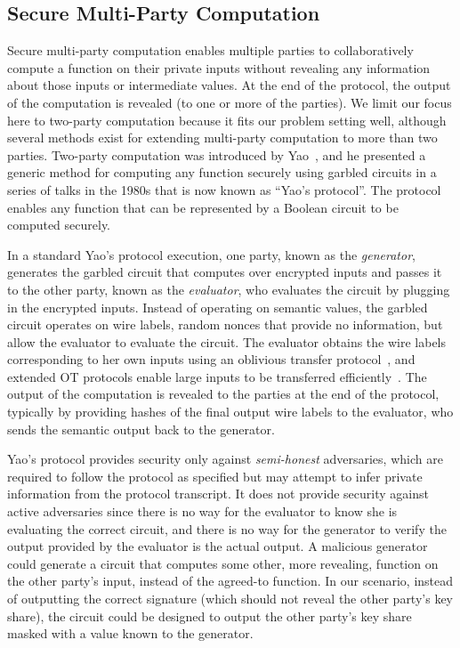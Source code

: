 \subsection{Secure Multi-Party Computation}
\label{sec:multi_party_computation}

Secure multi-party computation enables multiple parties to collaboratively compute a function on their private inputs without revealing any information about those inputs or intermediate values.  At the end of the protocol, the output of the computation is revealed (to one or more of the parties). We limit our focus here to two-party computation because it fits our problem setting well, although several methods exist for extending multi-party computation to more than two parties.  Two-party computation was introduced by Yao~\cite{yao1982protocols}, and he presented a generic method for computing any function securely using garbled circuits in a series of talks in the 1980s that is now known as ``Yao's protocol''.  The protocol enables any function that can be represented by a Boolean circuit to be computed securely. 

In a standard Yao's protocol execution, one party, known as the \emph{generator}, generates the garbled circuit that computes over encrypted inputs and passes it to the other party, known as the \emph{evaluator}, who evaluates the circuit by plugging in the encrypted inputs.  Instead of operating on semantic values, the garbled circuit operates on wire labels, random nonces that provide no information, but allow the evaluator to evaluate the circuit. The evaluator obtains the wire labels corresponding to her own inputs using an oblivious transfer protocol~\cite{even1985randomized}, and extended OT protocols enable large inputs to be transferred efficiently~\cite{ishai2003extending, naor2001efficient, nielsen2012new, harnik2008ot}. The output of the computation is revealed to the parties at the end of the protocol, typically by providing hashes of the final output wire labels to the evaluator, who sends the semantic output back to the generator.

Yao's protocol provides security only against \emph{semi-honest} adversaries, which are required to follow the protocol as specified but may attempt to infer private information from the protocol transcript.  It does not provide security against active adversaries since there is no way for the evaluator to know she is evaluating the correct circuit, and there is no way for the generator to verify the output provided by the evaluator is the actual output. A malicious generator could generate a circuit that computes some other, more revealing, function on the other party's input, instead of the agreed-to function. In our scenario, instead of outputting the correct signature (which should not reveal the other party's key share), the circuit could be designed to output the other party's key share masked with a value known to the generator.

